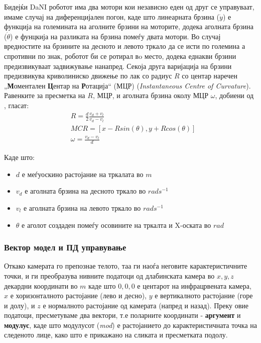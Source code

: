 \documentclass[11pt]{article}
\begin{document}
      Бидејќи DaNI роботот има два мотори кои независно еден од друг се управуваат, имаме случај на диференцијален погон, каде што линеарната брзина ($\dot y$) е функција на големината на аголните брзини на моторите, додека аголната брзина ($\dot \theta$) е фунцкија на разликата на брзина помеѓу двата мотори. Во случај вредностите на брзините на десното и левото тркало да се исти по големина а спротивни по знак, роботот би се ротирал вo место, додека еднакви брзини предизвикуваат задвижување нанапред. Секоја друга варијација на брзини предизвикува криволиниско движење по лак со радиус $R$ со центар наречен „\textbf{М}оментален \textbf{Ц}ентар на \textbf{Р}отација“ (МЦР) (\textit{Instantaneous Centre of Curvature}). Равенките за пресметка на $R$, МЦР, и аголната брзина околу МЦР $\omega$, добиени од \cite{differential_drive_robots}, гласат:
      \begin{align}
          & R = \frac{d}{2} \frac{v_d + v_l}{v_d - v_l} \\
          & {MCR} = [x - Rsin(\theta), y + Rcos(\theta)] \\
          & \omega = \frac{v_d - v_l}{d}
      \end{align}


      Каде што:
      \begin{itemize}
        \item $d$ е меѓуоскино растојание на тркалата во $m$
        \item $v_d$ е аголната брзина на десното тркало во $rad s^{-1}$
        \item $v_l$ е аголната брзина на левото тркало во $rad s^{-1}$
        \item $\theta$ е аголот создаден помеѓу осовините на тркалта и X-оската во $rad$
      \end{itemize}

    \subsubsection{Вектор модел и ПД управување} \label{sec:doublePD}
      Откако камерата го препознае телото, таа ги наоѓа неговите карактеристичните точки, и ги преобразува нивните податоци од длабинската камера во $ x,y,z $ декардни координати во $ m $ каде што $ 0,0,0 $ е центарот на инфрацрвената камера, $x$ е хоризонталното растојание (лево и десно), $y$ е вертикалното растојание (горе и долу), и $z$ е нормалното растојание од камерата (напред и назад). Преку овие податоци, пресметуваме два вектори, т.е поларните координати - \textbf{аргумент} и \textbf{модулус}, каде што модулусот (\textit{mod}) е растојанието до карактеристичната точка на следеното лице, како што е прикажано на сликата и пресметката подолу.
\end{document}
